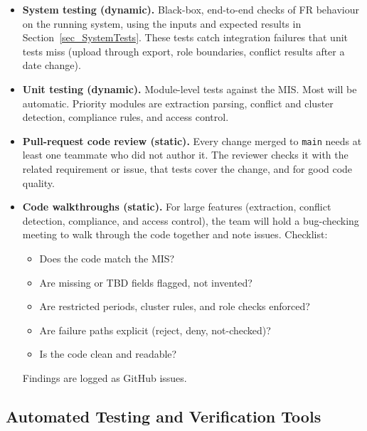 \documentclass[12pt, titlepage]{article}
\begin{document}
\begin{itemize}
\item \textbf{System testing (dynamic).}
  Black-box, end-to-end checks of FR behaviour on the running system, using the inputs and expected results in Section~\ref{sec_SystemTests}. These tests catch integration failures that unit tests miss (upload through export, role boundaries, conflict results after a date change).

\item \textbf{Unit testing (dynamic).}
  Module-level tests against the MIS. Most will be automatic. Priority modules are extraction parsing, conflict and cluster detection, compliance rules, and access control.

\item \textbf{Pull-request code review (static).}
  Every change merged to \texttt{main} needs at least one teammate who did not author it. The reviewer checks it with the related requirement or issue, that tests cover the change, and for good code quality.

\item \textbf{Code walkthroughs (static).}
  For large features (extraction, conflict detection, compliance, and access control), the team will hold a bug-checking meeting to walk through the code together and note issues. Checklist:
  \begin{itemize}
  \item Does the code match the MIS?
  \item Are missing or TBD fields flagged, not invented?
  \item Are restricted periods, cluster rules, and role checks enforced?
  \item Are failure paths explicit (reject, deny, not-checked)?
  \item Is the code clean and readable?
  \end{itemize}
  Findings are logged as GitHub issues.
\end{itemize}

\subsection{Automated Testing and Verification Tools}

\end{document}
